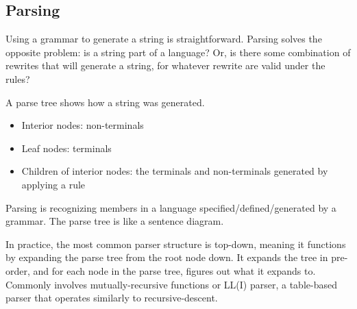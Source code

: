 \subsection{Parsing}

Using a grammar to generate a string is straightforward.
Parsing solves the opposite problem: is a string part of a
language? Or, is there some combination of rewrites that 
will generate a string, for whatever rewrite are valid 
under the rules?

A parse tree shows how a string was generated.
\begin{itemize}
    \item Interior nodes: non-terminals
    \item Leaf nodes: terminals
    \item Children of interior nodes: the terminals and non-terminals 
    generated by applying a rule
\end{itemize}

Parsing is recognizing members in a language 
specified/defined/generated by a grammar. The parse tree is like 
a sentence diagram. 

In practice, the most common parser structure is top-down,
meaning it functions by expanding the parse tree from the root 
node down. It expands the tree in pre-order, and for each 
node in the parse tree, figures out what it expands to. 
Commonly involves mutually-recursive functions or LL(I) 
parser, a table-based parser that operates similarly 
to recursive-descent. 

